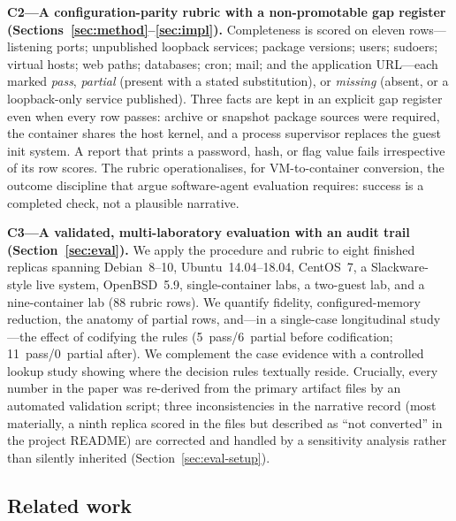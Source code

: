 \documentclass[3p,twocolumn,authoryear]{elsarticle}
\begin{document}
\textbf{C2---A configuration-parity rubric with a non-promotable gap
register (Sections~\ref{sec:method}--\ref{sec:impl}).} Completeness is
scored on eleven rows---listening ports; unpublished loopback services;
package versions; users; sudoers; virtual hosts; web paths; databases;
cron; mail; and the application URL---each marked \emph{pass},
\emph{partial} (present with a stated substitution), or \emph{missing}
(absent, or a loopback-only service published). Three facts are kept in
an explicit gap register even when every row passes: archive or
snapshot package sources were required, the container shares the host
kernel, and a process supervisor replaces the guest init system. A
report that prints a password, hash, or flag value fails irrespective
of its row scores. The rubric operationalises, for VM-to-container
conversion, the outcome discipline that \citet{jimenez2024} argue
software-agent evaluation requires: success is a completed check, not
a plausible narrative.

\textbf{C3---A validated, multi-laboratory evaluation with an audit
trail (Section~\ref{sec:eval}).} We apply the procedure and rubric to
eight finished replicas spanning Debian~8--10, Ubuntu~14.04--18.04,
CentOS~7, a Slackware-style live system, OpenBSD~5.9, single-container
labs, a two-guest lab, and a nine-container lab (88 rubric rows). We
quantify fidelity, configured-memory reduction, the anatomy of partial
rows, and---in a single-case longitudinal study---the effect of
codifying the rules (5~pass/6~partial before codification;
11~pass/0~partial after). We complement the case evidence with a
controlled lookup study showing where the decision rules textually
reside. Crucially, every number in the paper was re-derived from the
primary artifact files by an automated validation script; three
inconsistencies in the narrative record (most materially, a ninth
replica scored in the files but described as ``not converted'' in the
project README) are corrected and handled by a sensitivity analysis
rather than silently inherited (Section~\ref{sec:eval-setup}).

\subsection{Related work}
\label{sec:related}
\end{document}
